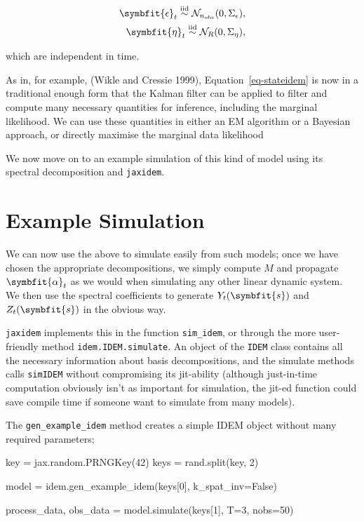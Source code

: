 \documentclass[
]{report}
\newenvironment{Shaded}{\begin{snugshade}}{\end{snugshade}}
\newcommand{\DecValTok}[1]{\textcolor[rgb]{0.68,0.00,0.00}{#1}}
\newcommand{\NormalTok}[1]{\textcolor[rgb]{0.00,0.23,0.31}{#1}}
\newcommand{\OperatorTok}[1]{\textcolor[rgb]{0.37,0.37,0.37}{#1}}
\newcommand{\VariableTok}[1]{\textcolor[rgb]{0.07,0.07,0.07}{#1}}
\newcommand{\bv}[1]{\symbfit{#1}}
\theoremstyle{plain}
\theoremstyle{plain}
\theoremstyle{plain}
\theoremstyle{remark}
\begin{document}
\[\begin{split}
\bv \epsilon_{t} \overset{\mathrm{iid}}{\sim} \mathcal N_{n_\mathrm{obs}}(0,\Sigma_\epsilon),\\
\bv \eta_{t} \overset{\mathrm{iid}}{\sim} \mathcal N_{R}(0,\Sigma_\eta),
\end{split}
\]

which are independent in time.

As in, for example, (Wikle and Cressie 1999),
Equation~\ref{eq-stateidem} is now in a traditional enough form that the
Kalman filter can be applied to filter and compute many necessary
quantities for inference, including the marginal likelihood. We can use
these quantities in either an EM algorithm or a Bayesian approach, or
directly maximise the marginal data likelihood

We now move on to an example simulation of this kind of model using its
spectral decomposition and \texttt{jaxidem}.

\section{Example Simulation}\label{example-simulation}

We can now use the above to simulate easily from such models; once we
have chosen the appropriate decompositions, we simply compute \(M\) and
propagate \(\bv \alpha_t\) as we would when simulating any other linear
dynamic system. We then use the spectral coefficients to generate
\(Y_t(\bv s)\) and \(Z_t(\bv s)\) in the obvious way.

\texttt{jaxidem} implements this in the function \texttt{sim\_idem}, or
through the more user-friendly method \texttt{idem.IDEM.simulate}. An
object of the \texttt{IDEM} class contains all the necessary information
about basis decompositions, and the simulate methods calls
\texttt{simIDEM} without compromising its jit-ability (although
just-in-time computation obviously isn't as important for simulation,
the jit-ed function could save compile time if someone want to simulate
from many models).

The \texttt{gen\_example\_idem} method creates a simple IDEM object
without many required parameters;

\begin{Shaded}
\begin{Highlighting}[]
\NormalTok{key }\OperatorTok{=}\NormalTok{ jax.random.PRNGKey(}\DecValTok{42}\NormalTok{)}
\NormalTok{keys }\OperatorTok{=}\NormalTok{ rand.split(key, }\DecValTok{2}\NormalTok{)}

\NormalTok{model }\OperatorTok{=}\NormalTok{ idem.gen\_example\_idem(keys[}\DecValTok{0}\NormalTok{], k\_spat\_inv}\OperatorTok{=}\VariableTok{False}\NormalTok{)}

\NormalTok{process\_data, obs\_data }\OperatorTok{=}\NormalTok{ model.simulate(keys[}\DecValTok{1}\NormalTok{], T}\OperatorTok{=}\DecValTok{3}\NormalTok{, nobs}\OperatorTok{=}\DecValTok{50}\NormalTok{)}
\end{Highlighting}
\end{Shaded}
\end{document}
